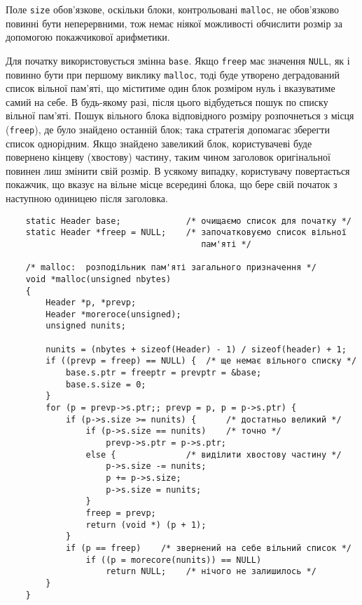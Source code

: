 \documentclass[a4paper,12pt]{book}
\begin{document}
  Поле \texttt{size} обов'язкове, оскільки блоки, контрольовані \texttt{malloc}, не
  обов'язково повинні бути неперервними, тож немає ніякої можливості
  обчислити розмір за допомогою покажчикової арифметики.

  Для початку використовується змінна \texttt{base}. Якщо \texttt{freep} має значення
  \texttt{NULL}, як і повинно бути при першому виклику \texttt{malloc}, тоді буде утворено
  деградований список вільної пам'яті, що міститиме один блок розміром нуль і вказуватиме
  самий на себе. В будь-якому разі, після цього відбудеться пошук по списку вільної
  пам'яті. Пошук вільного блока відповідного розміру розпочнеться з місця
  (\texttt{freep}), де було знайдено останній блок; така стратегія допомагає зберегти
  список однорідним. Якщо знайдено завеликий блок, користувачеві буде повернено кінцеву
  (хвостову) частину, таким чином заголовок оригінальної повинен лиш змінити свій розмір.
  В усякому випадку, користувачу повертається покажчик, що вказує на вільне місце всередині
  блока, що бере свій початок з наступною одиницею після заголовка.

  \begin{verbatim}
    static Header base;             /* очищаємо список для початку */
    static Header *freep = NULL;    /* започатковуємо список вільної
                                       пам'яті */

    /* malloc:  розподільник пам'яті загального призначення */
    void *malloc(unsigned nbytes)
    {
        Header *p, *prevp;
        Header *moreroce(unsigned);
        unsigned nunits;

        nunits = (nbytes + sizeof(Header) - 1) / sizeof(header) + 1;
        if ((prevp = freep) == NULL) {  /* ще немає вільного списку */
            base.s.ptr = freeptr = prevptr = &base;
            base.s.size = 0;
        }
        for (p = prevp->s.ptr;; prevp = p, p = p->s.ptr) {
            if (p->s.size >= nunits) {      /* достатньо великий */
                if (p->s.size == nunits)    /* точно */
                    prevp->s.ptr = p->s.ptr;
                else {              /* виділити хвостову частину */
                    p->s.size -= nunits;
                    p += p->s.size;
                    p->s.size = nunits;
                }
                freep = prevp;
                return (void *) (p + 1);
            }
            if (p == freep)    /* звернений на себе вільний список */
                if ((p = morecore(nunits)) == NULL)
                    return NULL;    /* нічого не залишилось */
        }
    }
  \end{verbatim}
\end{document}

